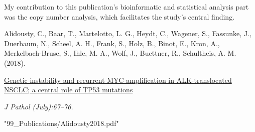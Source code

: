 \enlargethispage{\baselineskip}

\vfill
\noindent My contribution to this publication's bioinformatic and statistical
analysis part was the copy number analysis, which facilitates the study's
central finding.\nopagebreak
\medskip
\begin{tcolorbox}[
  boxrule=0pt, leftrule=1pt, colframe=s-blue, colback=white, sharp corners=all]%
  \raggedright
  Alidousty, C., Baar, T., Martelotto, L. G., Heydt, C., Wagener, S.,
  Fassunke, J., Duerbaum, N., Scheel, A. H., Frank, S., Holz, B., Binot, E.,
  Kron, A., Merkelbach-Bruse, S., Ihle, M. A., Wolf, J., Buettner, R.,
  Schultheis, A. M. (2018).
  
  \smallskip
  \href{http://doi.wiley.com/10.1002/path.5110}
    {Genetic instability and recurrent MYC amplification in ALK-translocated
    NSCLC; a central role of TP53 mutations}

  \smallskip
  \textit{J Pathol (July):67–76.}
\end{tcolorbox}



  {"99_Publications/Alidousty2018.pdf"}


\null
\thispagestyle{empty}
\newpage